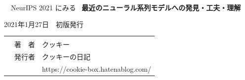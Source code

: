 \documentclass[b5paper,xelatex,ja=standard,10pt]{bxjsarticle}
\begin{document}
\clearpage
\vspace*{16.5cm} %
 \, \, NeurIPS 2021 にみる \, \textbf{\large 最近のニューラル系列モデルへの発見・工夫・理解}
\vspace*{-0.27cm}
\begin{OKUDUKE}[title={未完成ドラフト}]
2021年1月27日　初版発行 \\
{
\renewcommand\arraystretch{0.9}
\begin{tabular}{p{4cm}rp{5.9cm}}
 &  &  \\
 & 著　者 & クッキー \\
 & 発行者 & クッキーの日記 \\
 & & https://cookie-box.hatenablog.com/ 
\end{tabular}
}
\end{OKUDUKE}
\thispagestyle{empty}
\end{document}
